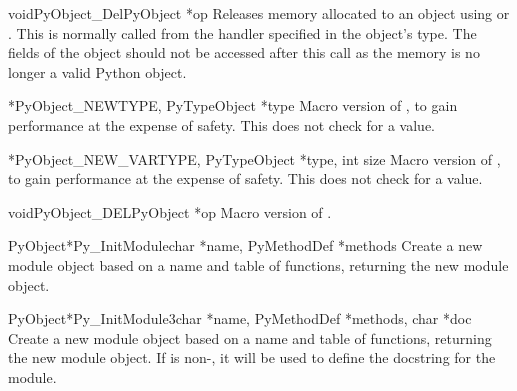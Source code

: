 \documentclass{manual}
\begin{document}
\begin{cfuncdesc}{void}{PyObject_Del}{PyObject *op}
  Releases memory allocated to an object using
   or .  This
  is normally called from the  handler specified in
  the object's type.  The fields of the object should not be accessed
  after this call as the memory is no longer a valid Python object.
\end{cfuncdesc}

\begin{cfuncdesc}{*}{PyObject_NEW}{TYPE, PyTypeObject *type}
  Macro version of , to gain performance at
  the expense of safety.  This does not check  for a \NULL{}
  value.
\end{cfuncdesc}

\begin{cfuncdesc}{*}{PyObject_NEW_VAR}{TYPE, PyTypeObject *type,
                                                int size}
  Macro version of , to gain performance
  at the expense of safety.  This does not check  for a
  \NULL{} value.
\end{cfuncdesc}

\begin{cfuncdesc}{void}{PyObject_DEL}{PyObject *op}
  Macro version of .
\end{cfuncdesc}

\begin{cfuncdesc}{PyObject*}{Py_InitModule}{char *name,
                                            PyMethodDef *methods}
  Create a new module object based on a name and table of functions,
  returning the new module object.
\end{cfuncdesc}

\begin{cfuncdesc}{PyObject*}{Py_InitModule3}{char *name,
                                             PyMethodDef *methods,
                                             char *doc}
  Create a new module object based on a name and table of functions,
  returning the new module object.  If  is non-\NULL, it will
  be used to define the docstring for the module.
\end{cfuncdesc}
\end{document}
